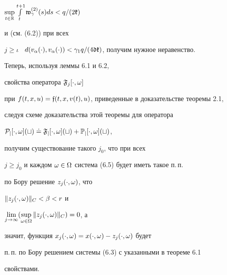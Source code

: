 $\sup\limits_{t\in\Bbb R}\int\limits_{t}^{t+1}\frak w_{\gamma}^{(2)}(s)ds<q/(2\frak k)$


и (см. (6.2)) при всех


$j\ge\iota$ \ $d(v_{\alpha}(\cdot),v_{\alpha}(\cdot))


<\gamma_{1}q/(4\frak d\frak k)$, получим нужное неравенство.





Теперь, используя леммы 6.1 и 6.2,


свойства оператора $\frak F_{j}[\cdot,\omega]$


при $f(t,x,u)={\frak f}(t,x,v(t),u)$, приведенные в доказательстве теоремы 2.1,


следуя схеме доказательства этой теоремы для оператора


$\cal P_{j}[\cdot,\om](t)\doteq


\frak F_{j}[\cdot,\om](t)+\Bbb P_{j}[\cdot,\om](t)$,


получим существование такого $j_{0}$, что при всех


$j\ge j_{0}$ и каждом $\omega\in\Omega$ система (6.5) будет иметь такое п.\,п.


по Бору решение $z_{j}(\cdot,\omega)$, что


$\|z_{j}(\cdot,\omega)\|_{C}<\beta<r$ и


$\lim\limits_{j\to\infty}(\sup\limits_{\omega\in\Omega}\|z_{j}(\cdot,\omega)\|_{C})=0$, а


значит, функция $x_{j}(\cdot,\omega)=x(\cdot,\omega)-z_{j}(\cdot,\omega)$ будет


п.\,п. по Бору решением системы (6.3) с указанными в теореме 6.1


свойствами.








